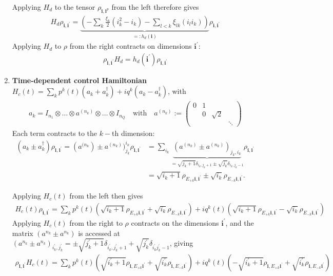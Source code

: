 \documentclass[letterpaper]{article}
\newcommand{\bfi}{\boldsymbol{i}}
\newcommand{\p}{\prime}
\begin{document}
\begin{enumerate}
      Applying $H_d$ to the tensor $\rho_{\bfi, \bfi^p}$ from the left therefore
      gives  
      \begin{align}
        H_d \rho_{\bfi, \bfi^\p} = \underbrace{\left(-\sum_k
        \frac{\xi_k}{2}(i_k^2 - i_k) - \sum_{l<k} \xi_{lk} (i_l i_k)
        \right)}_{=:h_d(\bfi)} \rho_{\bfi, \bfi^\p}
      \end{align}
      Applying $H_d$ to $\rho$ from the right contracts on dimensions
      $\bfi^\prime$:
      \begin{align}
        \rho_{\bfi, \bfi^\p} H_d  = h_d(\bfi^\p) \rho_{\bfi,\bfi^\p}
      \end{align}

    \item \textbf{Time-dependent control Hamiltonian} $H_c(t) = \sum_k p^k(t)
      (a_k + a_k^\dag) + iq^k(a_k - a_k^\dag)$, with  
      \begin{align}
      a_k = I_{n_1}\otimes \dots \otimes a^{(n_k)} \otimes \dots \otimes I_{n_Q}
        \quad \text{with} \quad a^{(n_k)} := \begin{pmatrix} 0 & 1 & \\ & 0 &
        \sqrt{2} \\ & & & \ddots \end{pmatrix}
      \end{align}
      Each term contracts to the $k-$th dimension:
      \begin{align}
        (a_k\pm a_k^\dag) \rho_{\bfi,\bfi^\p} = (a^{(n_k}) \pm
        a^{(n_k)})^{i_k}_{j_k} \rho_{\bfi,\bfi^\prime} &= \sum_{i_k}
        \underbrace{(a^{(n_k)} \pm a^{(n_k)})_{j_k,i_k}}_{= \sqrt{j_k+1}
        \delta_{i_k,j_k+1} \pm \sqrt{j_k} \delta_{i_k,j_k-1}} \rho_{\bfi,
        \bfi^{\prime}} \\
        &= \sqrt{i_k+1} \rho_{E_{+k}\bfi, \bfi^\prime} \pm \sqrt{i_k}
        \rho_{E_{-k}\bfi, \bfi^\prime}.
      \end{align} 

      Applying $H_c(t)$ from the left then gives 
      \begin{align}
        H_c(t) \rho_{\bfi, \bfi^\prime} = \sum_k p^k(t) \left(\sqrt{i_k+1}
        \rho_{E_{+k}\bfi,\bfi^\prime} + \sqrt{i_k} \rho_{E_{-k}
        \bfi,\bfi^\prime} \right) + iq^k(t) \left(\sqrt{i_k+1}
        \rho_{E_{+k}\bfi,\bfi^\prime} - \sqrt{i_k} \rho_{E_{-k}\bfi,\bfi^\prime}
        \right)
      \end{align}
      Applying $H_c(t)$ from the right to $\rho$ contracts on the dimensions
      $\bfi^\prime$, and the matrix $(a^{n_k } \pm a^{n_k})$ is accessed at
      $(a^{n_k } \pm a^{n_k})_{i_k^\prime,j_k^\prime} = \pm \sqrt{j_k^\prime+1}
      \delta_{i_k^\prime, j_k^\prime +1} + \sqrt{j_k^\prime} \delta_{i_k^\prime
      j_k^\prime -1}$, giving
      \begin{align}
        \rho_{\bfi, \bfi^\prime} H_c(t) = \sum_k p^k(t)
        \left(\sqrt{i_k^\prime+1} \rho_{\bfi,E_{+k}\bfi^\prime} +
        \sqrt{i_k^\prime} \rho_{\bfi,E_{-k}\bfi^\prime} \right) + iq^k(t) \left(
        - \sqrt{i_k^\prime+1} \rho_{\bfi,E_{+k}\bfi^\prime} + \sqrt{i_k^\prime}
        \rho_{\bfi,E_{-k}\bfi^\prime} \right)
      \end{align}


\end{enumerate}
\end{document}
